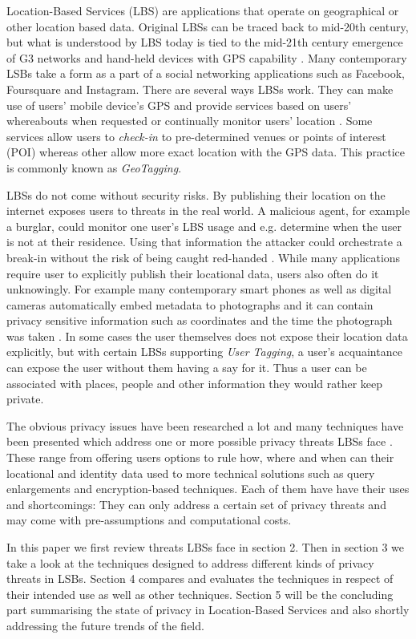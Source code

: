 \documentclass[english]{tktltiki2}
\theoremstyle{definition}
\theoremstyle{remark}
\begin{document}
Location-Based Services (LBS) are applications that operate on geographical or other location based data. Original LBSs can be traced back to mid-20th century, but what is understood by LBS today is tied to the mid-21th century emergence of G3 networks and hand-held devices with GPS capability \cite{History}. Many contemporary LSBs take a form as a part of a social networking applications such as Facebook, Foursquare and Instagram. There are several ways LBSs work. They can make use of users' mobile device's GPS and provide services based on users' whereabouts when requested or continually monitor users' location \cite{LocationPrivacy}. Some services allow users to \textit{check-in} to pre-determined venues or points of interest (POI) whereas other allow more exact location with the GPS data. This practice is commonly known as \textit{GeoTagging}. \par
LBSs do not come without security risks. By publishing their location on the internet exposes users to threats in the real world. A malicious agent, for example a burglar, could monitor one user's LBS usage and e.g. determine when the user is not at their residence. Using that information the attacker could orchestrate a break-in without the risk of being caught red-handed \cite{Friedland2010}. While many applications require user to explicitly publish their locational data, users also often do it unknowingly. For example many contemporary smart phones as well as digital cameras automatically embed metadata to photographs and it can contain privacy sensitive information such as coordinates and the time the photograph was taken \cite{Friedland2010}. In some cases the user themselves does not expose their location data explicitly, but with certain LBSs supporting \textit{User Tagging}, a user's acquaintance can expose the user without them having a say for it. Thus a user can be associated with places, people and other information they would rather keep private. \par
The obvious privacy issues have been researched a lot and many techniques have been presented which address one or more possible privacy threats LBSs face \cite{LocationPrivacy}. These range from offering users options to rule how, where and when can their locational and identity data used to more technical solutions such as query enlargements and encryption-based techniques. Each of them have have their uses and shortcomings: They can only address a certain set of privacy threats and may come with pre-assumptions and computational costs. \par 
In this paper we first review threats LBSs face in section 2. Then in section 3 we take a look at the techniques designed to address different kinds of privacy threats in LSBs. Section 4 compares and evaluates the techniques in respect of their intended use as well as other techniques. Section 5 will be the concluding part summarising the state of privacy in Location-Based Services and also shortly addressing the future trends of the field. 
\end{document}
